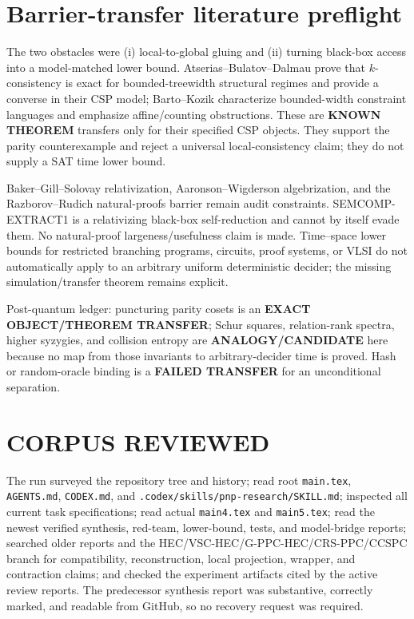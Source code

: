 \documentclass[11pt]{article}
\newcommand{\status}[1]{\textbf{#1}}
\begin{document}
\section{Barrier-transfer literature preflight}
The two obstacles were (i) local-to-global gluing and (ii) turning black-box access into a model-matched lower bound.  Atserias--Bulatov--Dalmau prove that $k$-consistency is exact for bounded-treewidth structural regimes and provide a converse in their CSP model; Barto--Kozik characterize bounded-width constraint languages and emphasize affine/counting obstructions.  These are \status{KNOWN THEOREM} transfers only for their specified CSP objects.  They support the parity counterexample and reject a universal local-consistency claim; they do not supply a SAT time lower bound.

Baker--Gill--Solovay relativization, Aaronson--Wigderson algebrization, and the Razborov--Rudich natural-proofs barrier remain audit constraints.  SEMCOMP-EXTRACT1 is a relativizing black-box self-reduction and cannot by itself evade them.  No natural-proof largeness/usefulness claim is made.  Time--space lower bounds for restricted branching programs, circuits, proof systems, or VLSI do not automatically apply to an arbitrary uniform deterministic decider; the missing simulation/transfer theorem remains explicit.

Post-quantum ledger: puncturing parity cosets is an \status{EXACT OBJECT/THEOREM TRANSFER}; Schur squares, relation-rank spectra, higher syzygies, and collision entropy are \status{ANALOGY/CANDIDATE} here because no map from those invariants to arbitrary-decider time is proved.  Hash or random-oracle binding is a \status{FAILED TRANSFER} for an unconditional separation.

\section{CORPUS REVIEWED}
The run surveyed the repository tree and history; read root \texttt{main.tex}, \texttt{AGENTS.md}, \texttt{CODEX.md}, and \texttt{.codex/skills/pnp-research/SKILL.md}; inspected all current task specifications; read actual \texttt{main4.tex} and \texttt{main5.tex}; read the newest verified synthesis, red-team, lower-bound, tests, and model-bridge reports; searched older reports and the HEC/VSC-HEC/G-PPC-HEC/CRS-PPC/CCSPC branch for compatibility, reconstruction, local projection, wrapper, and contraction claims; and checked the experiment artifacts cited by the active review reports.  The predecessor synthesis report was substantive, correctly marked, and readable from GitHub, so no recovery request was required.
\end{document}
